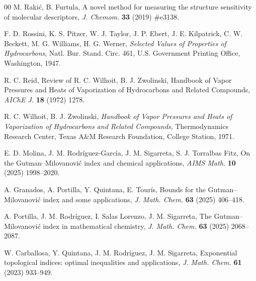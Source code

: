 \documentclass[a5paper, 10pt]{article}
\theoremstyle{plain}
\theoremstyle{remark}
\theoremstyle{definition}
\begin{document}
\begin{thebibliography}{00}
   M. Raki\'c, B. Furtula, A novel method for
  measuring the structure sensitivity of molecular descriptors, \textit{J. Chemom.\/} \textbf{33} (2019) \#e3138.

   F. D. Rossini, K. S. Pitzer, W. J. Taylor,
  J. P. Ebert, J. E. Kilpatrick, C. W. Beckett, M. G. Williams, H. G. Werner,
  \textit{Selected Values of Properties of Hydrocarbons\/}, Natl. Bur.
  Stand. Circ. 461, U.S. Government Printing Office, Washington, 1947.

   R. C. Reid, Review of R. C. Wilhoit, B. J. Zwolinski, Handbook
  of Vapor Pressures and Heats of Vaporization of Hydrocarbons and Related
  Compounds, \textit{AIChE J.\/} \textbf{18} (1972) 1278.

   R. C. Wilhoit, B. J. Zwolinski,
  \textit{Handbook of Vapor Pressures and Heats of Vaporization of
  Hydrocarbons and Related Compounds\/}, Thermodynamics Research Center, Texas A\&M Research Foundation,
  College Station, 1971.

   E. D. Molina, J. M.
  Rodr\'iguez-Garc\'ia, J. M. Sigarreta, S. J. Torralbas Fitz, On the
  Gutman--Milovanovi\'c index and chemical applications, \textit{AIMS
  Math.\/} \textbf{10} (2025) 1998--2020.

   A. Granados, A. Portilla, Y. Quintana,
  E. Tour\'is, Bounds for the Gutman--Milovanovi\'c index and some
  applications, \textit{J. Math. Chem.\/} \textbf{63} (2025)
  406--418.

   A. Portilla, J. M. Rodr\'iguez,
  I. Salas Lorenzo, J. M. Sigarreta, The Gutman--Milovanovi\'c index
  in mathematical chemistry, \textit{J. Math. Chem.\/} \textbf{63}
  (2025) 2068--2087.

   W. Carballosa, Y. Quintana,
  J. M. Rodr\'iguez, J. M. Sigarreta, Exponential topological indices: optimal
  inequalities and applications, \textit{J. Math. Chem.\/} \textbf{61} (2023) 933--949.

\end{thebibliography}
\end{document}

